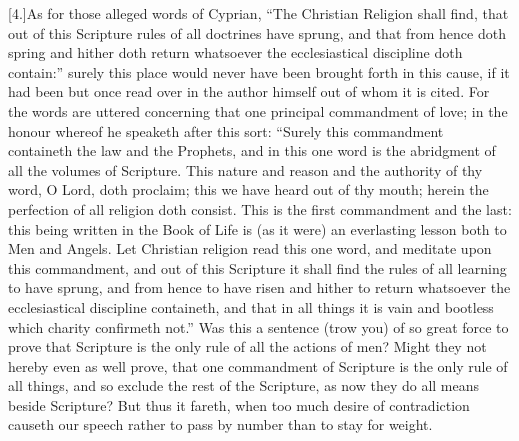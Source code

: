 [4.]As for those alleged words of Cyprian, “The Christian Religion shall find, that out of this Scripture rules of all doctrines have sprung, and that from hence doth spring and hither doth return whatsoever the ecclesiastical discipline doth contain:” surely this place would never have been brought forth in this cause, if it had been but once read over in the author himself out of whom it is cited. For the words are uttered concerning that one principal commandment of love; in the honour whereof he speaketh after this sort: “Surely this commandment containeth the law and  the Prophets, and in this one word is the abridgment of all the volumes of Scripture. This nature and reason and the authority of thy word, O Lord, doth proclaim; this we have heard out of thy mouth; herein the perfection of all religion doth consist. This is the first commandment and the last: this being written in the Book of Life is (as it were) an everlasting lesson both to Men and Angels. Let Christian religion read this one word, and meditate upon this commandment, and out of this Scripture it shall find the rules of all learning to have sprung, and from hence to have risen and hither to return whatsoever the ecclesiastical discipline containeth, and that in all things it is vain and bootless which charity confirmeth not.” Was this a sentence (trow you) of so great force to prove that Scripture is the only rule of all the actions of men? Might they not hereby even as well prove, that one commandment of Scripture is the only rule of all things, and so exclude the rest of the Scripture, as now they do all means beside Scripture? But thus it fareth, when too much desire of contradiction causeth our speech rather to pass by number than to stay for weight.


